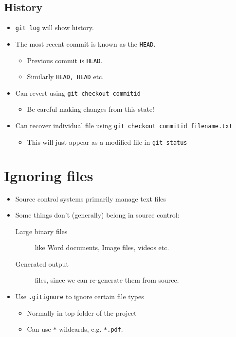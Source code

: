 \documentclass[slides]{pgnotes}
\begin{document}
\subsection{History}

\begin{itemize}
\item \texttt{git log} will show history.
\item The most recent commit is known as the \texttt{HEAD}.
  \begin{itemize}
  \item Previous commit is \texttt{HEAD}.
  \item Similarly \texttt{HEAD, HEAD} etc. 
  \end{itemize}
\item Can revert using \texttt{git checkout commitid}
  \begin{itemize}
  \item Be careful making changes from this state!
  \end{itemize}
\item Can recover individual file using \texttt{git checkout commitid filename.txt}
  \begin{itemize}
  \item This will just appear as a modified file in \texttt{git status}
  \end{itemize}
\end{itemize}

\section{Ignoring files}

\begin{itemize}
\item Source control systems primarily manage text files
\item Some things don't (generally) belong in source control:
  \begin{description}
  \item[Large binary files] like Word documents, Image files, videos etc.
  \item[Generated output] files, since we can re-generate them from source.
  \end{description}
\item Use \texttt{.gitignore} to ignore certain file types
  \begin{itemize}
  \item Normally in top folder of the project
  \item Can use \texttt{*} wildcards, e.g. \texttt{*.pdf}.
  \end{itemize}
\end{itemize}
\end{document}
